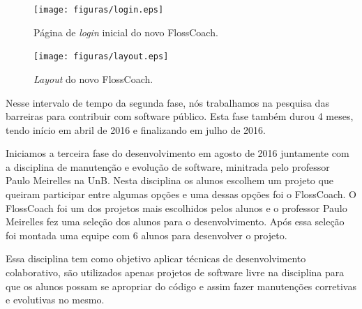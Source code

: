 \begin{figure}[h]
	\centering
	\label{fig:prototipo}
		\texttt{[image: figuras/login.eps]}
	\caption{Página de \textit{login} inicial do novo FlossCoach.}
\end{figure}


\begin{figure}[h]
	\centering
	\label{fig:prototipo}
		\texttt{[image: figuras/layout.eps]}
	\caption{\textit{Layout} do novo FlossCoach.}
\end{figure}


Nesse intervalo de tempo da segunda fase, nós trabalhamos na pesquisa das barreiras para
contribuir com software público. Esta fase também durou 4 meses, tendo início em abril 
de 2016 e finalizando em julho de 2016.

Iniciamos a terceira fase do desenvolvimento em agosto de 2016 juntamente com a disciplina 
de manutenção e evolução de software, minitrada pelo professor Paulo Meirelles na UnB. 
Nesta disciplina os alunos escolhem um projeto que queiram participar entre algumas opções 
e uma dessas opções foi o FlossCoach. O FlossCoach foi um dos 
projetos mais escolhidos pelos alunos e o professor Paulo Meirelles fez uma seleção
dos alunos para o desenvolvimento. Após essa seleção foi montada uma equipe com
6 alunos para desenvolver o projeto.

Essa disciplina tem como objetivo aplicar técnicas de desenvolvimento colaborativo,
são utilizados apenas projetos de software livre na disciplina para que os alunos 
possam se apropriar do código e assim fazer manutenções corretivas e evolutivas no
mesmo.


